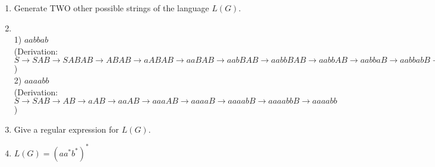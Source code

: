 \documentclass[a4paper, 12pt]{article}
\makeatletter
\renewenvironment{proof}[1][\proofname]{\par
  \normalfont \topsep6\p@\@plus6\p@\relax
  \trivlist
  \item[\hskip\labelsep
        \itshape
    #1\@addpunct{.}]\ignorespaces
}{%
  \endtrivlist\@endpefalse
}
\renewcommand{\proofname}{Solution:}
\makeatother
\begin{document}
\begin{enumerate}
\begin{enumerate}
            \item Generate TWO other possible strings of the language $L(G)$.
            \begin{proof}
            \hfill \\
                1) $aabbab$ \\
                (Derivation: $S \to SAB \to SABAB \to ABAB \to aABAB \to aaBAB \to aabBAB \to aabbBAB \to aabbAB \to aabbaB \to aabbabB \to aabbab$) \\
                
                2) $aaaabb$ \\
                (Derivation: $S \to SAB \to AB \to aAB \to aaAB \to aaaAB \to aaaaB \to aaaabB \to aaaabbB \to aaaabb$)
            \end{proof}
            
            \item Give a regular expression for $L(G)$.
            \begin{proof}
                $L(G)=(aa^*b^*)^*$
            \end{proof}
        \end{enumerate}
    \end{enumerate}


\newpage
\end{document}
